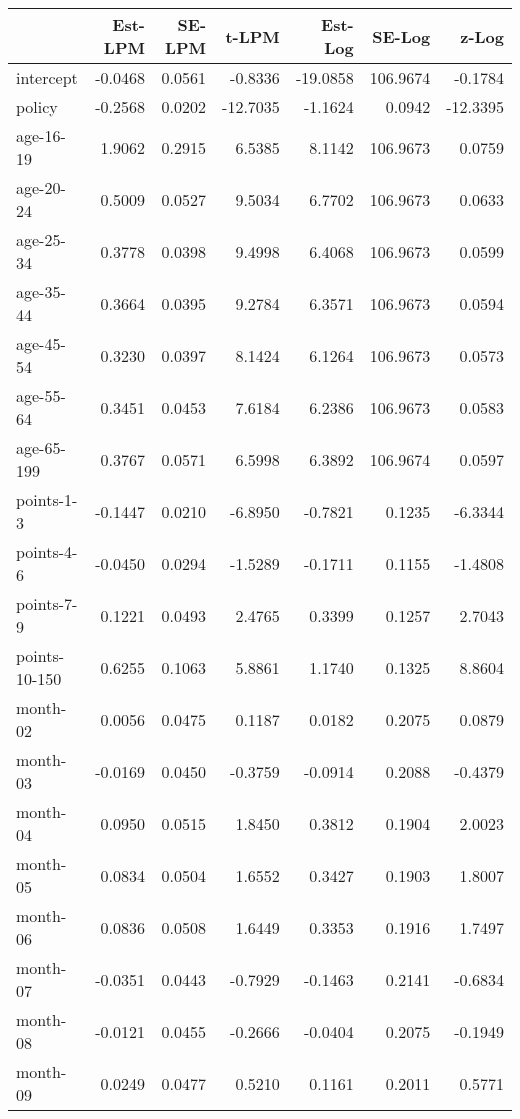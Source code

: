 \documentclass[10pt]{article}
\begin{document}
\begin{table}[ht]
\centering
\begin{tabular}{lrrrrrr}
  \hline
 & Est-LPM & SE-LPM & t-LPM & Est-Log & SE-Log & z-Log \\ 
  \hline
intercept & -0.0468 & 0.0561 & -0.8336 & -19.0858 & 106.9674 & -0.1784 \\ 
  policy & -0.2568 & 0.0202 & -12.7035 & -1.1624 & 0.0942 & -12.3395 \\ 
  age-16-19 & 1.9062 & 0.2915 & 6.5385 & 8.1142 & 106.9673 & 0.0759 \\ 
  age-20-24 & 0.5009 & 0.0527 & 9.5034 & 6.7702 & 106.9673 & 0.0633 \\ 
  age-25-34 & 0.3778 & 0.0398 & 9.4998 & 6.4068 & 106.9673 & 0.0599 \\ 
  age-35-44 & 0.3664 & 0.0395 & 9.2784 & 6.3571 & 106.9673 & 0.0594 \\ 
  age-45-54 & 0.3230 & 0.0397 & 8.1424 & 6.1264 & 106.9673 & 0.0573 \\ 
  age-55-64 & 0.3451 & 0.0453 & 7.6184 & 6.2386 & 106.9673 & 0.0583 \\ 
  age-65-199 & 0.3767 & 0.0571 & 6.5998 & 6.3892 & 106.9674 & 0.0597 \\ 
  points-1-3 & -0.1447 & 0.0210 & -6.8950 & -0.7821 & 0.1235 & -6.3344 \\ 
  points-4-6 & -0.0450 & 0.0294 & -1.5289 & -0.1711 & 0.1155 & -1.4808 \\ 
  points-7-9 & 0.1221 & 0.0493 & 2.4765 & 0.3399 & 0.1257 & 2.7043 \\ 
  points-10-150 & 0.6255 & 0.1063 & 5.8861 & 1.1740 & 0.1325 & 8.8604 \\ 
  month-02 & 0.0056 & 0.0475 & 0.1187 & 0.0182 & 0.2075 & 0.0879 \\ 
  month-03 & -0.0169 & 0.0450 & -0.3759 & -0.0914 & 0.2088 & -0.4379 \\ 
  month-04 & 0.0950 & 0.0515 & 1.8450 & 0.3812 & 0.1904 & 2.0023 \\ 
  month-05 & 0.0834 & 0.0504 & 1.6552 & 0.3427 & 0.1903 & 1.8007 \\ 
  month-06 & 0.0836 & 0.0508 & 1.6449 & 0.3353 & 0.1916 & 1.7497 \\ 
  month-07 & -0.0351 & 0.0443 & -0.7929 & -0.1463 & 0.2141 & -0.6834 \\ 
  month-08 & -0.0121 & 0.0455 & -0.2666 & -0.0404 & 0.2075 & -0.1949 \\ 
  month-09 & 0.0249 & 0.0477 & 0.5210 & 0.1161 & 0.2011 & 0.5771 \\ 

\end{tabular}
\end{table}
\end{document}
